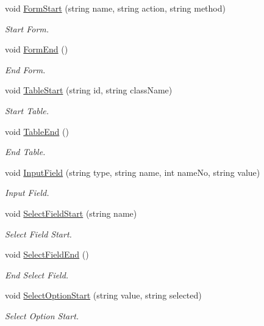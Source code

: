 \begin{DoxyCompactItemize}
void \hyperlink{classHTMLTags_a1489ccf4629069eca5e550eeb8e8e887}{Form\-Start} (string name, string action, string method)
\begin{DoxyCompactList}\small\item\em Start Form. \end{DoxyCompactList}\item 
void \hyperlink{classHTMLTags_ab57baef28db9590ce59d0e2f403a210f}{Form\-End} ()
\begin{DoxyCompactList}\small\item\em End Form. \end{DoxyCompactList}\item 
void \hyperlink{classHTMLTags_a9d4bc37c7d615bc1d7f7c738dae48ad3}{Table\-Start} (string id, string class\-Name)
\begin{DoxyCompactList}\small\item\em Start Table. \end{DoxyCompactList}\item 
void \hyperlink{classHTMLTags_a0655d9f70a8c1a61c406280d8fb9df7a}{Table\-End} ()
\begin{DoxyCompactList}\small\item\em End Table. \end{DoxyCompactList}\item 
void \hyperlink{classHTMLTags_a705aef36f0847c2a5f10a5df8e079ce8}{Input\-Field} (string type, string name, int name\-No, string value)
\begin{DoxyCompactList}\small\item\em Input Field. \end{DoxyCompactList}\item 
void \hyperlink{classHTMLTags_adb6e7ef0a1320dbf6d4acbe1ea3e418f}{Select\-Field\-Start} (string name)
\begin{DoxyCompactList}\small\item\em Select Field Start. \end{DoxyCompactList}\item 
void \hyperlink{classHTMLTags_adde967a90e03f4b5168b9bffd319980b}{Select\-Field\-End} ()
\begin{DoxyCompactList}\small\item\em End Select Field. \end{DoxyCompactList}\item 
void \hyperlink{classHTMLTags_a372570979ccc675e0ed752fe272e3cd6}{Select\-Option\-Start} (string value, string selected)
\begin{DoxyCompactList}\small\item\em Select Option Start. \end{DoxyCompactList}\item 

\end{DoxyCompactItemize}
